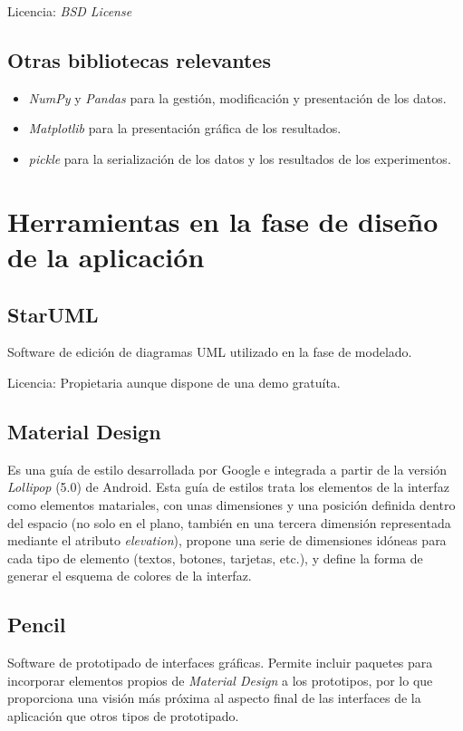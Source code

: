 Licencia: \textit{BSD License }

\subsection{Otras bibliotecas relevantes}
\begin{itemize}
	\item \textit{NumPy} y \textit{Pandas} para la gestión, modificación y presentación de los datos. 
	\item \textit{Matplotlib} para la presentación gráfica de los resultados. 
	\item \textit{pickle} para la serialización de los datos y los resultados de los experimentos. 
\end{itemize}

\section{Herramientas en la fase de diseño de la aplicación}

\subsection{StarUML}

Software de edición de diagramas UML utilizado en la fase de modelado. 

Licencia: Propietaria aunque dispone de una demo gratuíta. 

\subsection{Material Design}

Es una guía de estilo desarrollada por Google e integrada a partir de la versión \textit{Lollipop} (5.0) de Android. Esta guía de estilos trata los elementos de la interfaz como elementos matariales, con unas dimensiones y una posición definida dentro del espacio (no solo en el plano, también en una tercera dimensión representada mediante el atributo \textit{elevation}), propone una serie de dimensiones idóneas para cada tipo de elemento (textos, botones, tarjetas, etc.), y define la forma de generar el esquema de colores de la interfaz.

\subsection{Pencil}

Software de prototipado de interfaces gráficas. Permite incluir paquetes para incorporar elementos propios de \textit{Material Design} a los prototipos, por lo que proporciona una visión más próxima al aspecto final de las interfaces de la aplicación que otros tipos de prototipado. 

